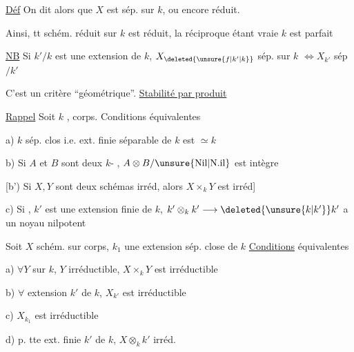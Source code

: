 \uline{Déf} On dit alors que $X$ est sép. sur $k$, ou encore   réduit.

Ainsi,  tt schém.  réduit sur $k$ est  réduit, la réciproque étant vraie  $k$ est parfait

\uline{NB} Si $k'/k$ est une extension de $k$, $X_{\deleted{\unsure{f|k'|k}}}$ sép. sur $k$ $\Longleftrightarrow X_{k'}$ sép $/k'$

C'est un critère ``géométrique''. \hfill\uline{Stabilité par produit}


\uline{Rappel} Soit $k$ , corps. Conditions équivalentes

a) $k$ sép. clos i.e.  ext. finie séparable de $k$ est $\simeq k$

b) Si $A$ et $B$ sont deux $k$- , $A\otimes B/\mathrm{\unsure{Nil|N.il}}$ est intègre

[b') Si $X,Y$ sont deux schémas irréd, alors $X\times_k Y$ est irréd]

c) Si , $k'$ est une extension finie de $k$, $k'\otimes_k k'\longrightarrow\deleted{\unsure{k|k'}}k'$ a un noyau nilpotent


Soit $X$ schém. sur corps, $k_1$ une extension sép. close de $k$ \uline{Conditions} équivalentes

a) $\forall Y$ sur $k$, $Y$ irréductible, $X\times_k Y$ est irréductible

b) $\forall$ extension $k'$ de $k$, $X_{k'}$ est irréductible

c) $X_{k_1}$ est irréductible

d) p. tte ext. finie  $k'$ de $k$, $X\otimes_k k'$ irréd.


